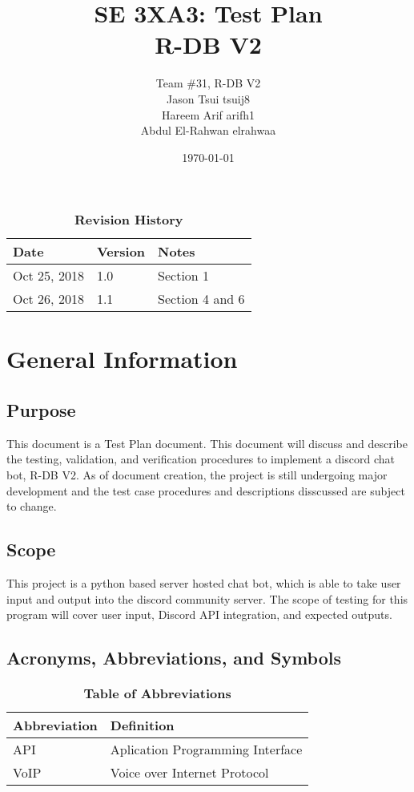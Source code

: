 \documentclass[12pt, titlepage]{article}
\title{SE 3XA3: Test Plan\\R-DB V2}
\author{Team \#31, R-DB V2
		\\ Jason Tsui tsuij8
		\\ Hareem Arif arifh1
		\\ Abdul El-Rahwan elrahwaa
}
\date{\today}
\begin{document}
\maketitle

\tableofcontents
\listoftables
\listoffigures

\begin{table}[bp]
\caption{\bf Revision History}
\begin{tabularx}{\textwidth}{p{3cm}p{2cm}X}
\toprule {\bf Date} & {\bf Version} & {\bf Notes}\\
\midrule
Oct 25, 2018 & 1.0 & Section 1\\
Oct 26, 2018 & 1.1 & Section 4 and 6\\
\bottomrule
\end{tabularx}
\end{table}

\newpage


\section{General Information}

\subsection{Purpose}
This document is a Test Plan document. This document will discuss and describe the testing, validation, and verification procedures to implement a discord chat bot, R-DB V2. As of document creation, the project is still undergoing major development and the test case procedures and descriptions disscussed are subject to change.

\subsection{Scope}
This project is a python based server hosted chat bot, which is able to take user input and output into the discord community server. The scope of testing for this program will cover user input, Discord API integration, and expected outputs. 

\subsection{Acronyms, Abbreviations, and Symbols}
	
\begin{table}[hbp]
\caption{\textbf{Table of Abbreviations}} \label{Table}

\begin{tabularx}{\textwidth}{p{3cm}X}
\toprule
\textbf{Abbreviation} & \textbf{Definition} \\
\midrule
API & Aplication Programming Interface\\
VoIP & Voice over Internet Protocol\\
\bottomrule
\end{tabularx}

\end{table}
\end{document}
